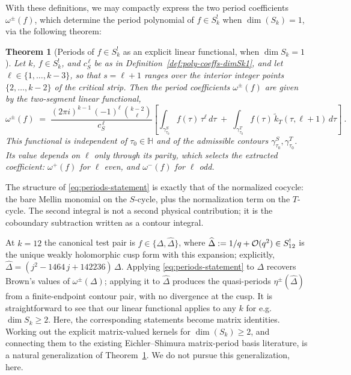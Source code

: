 \documentclass[11pt]{article}
\newtheorem{theorem}{Theorem}[section]
\numberwithin{equation}{section}  %
\newcommand{\HH}{\mathbb{H}}
\newcommand{\Dhat}{\widehat{\Delta}}
\begin{document}
\noindent With these definitions, we may compactly express the two
period coefficients $\omega^{\pm}(f)$, which determine the period
polynomial of $f \in S_k^!$ when $\dim(S_k) = 1$, via the following
theorem: 
\begin{theorem}[Periods of $f \in S_k^!$ as an explicit linear functional, when $\dim S_k = 1$]\label{thm:periods}
Let $k$, $f \in S_k^!$, and $c_S^{\,\ell}$ be as in
Definition~\ref{def:poly-coeffs-dimSk1}, and let
$\ell \in \{1, \ldots, k - 3\}$, so that $s = \ell + 1$ ranges over the
interior integer points $\{2, \ldots, k-2\}$ of the critical strip.
Then the period coefficients $\omega^\pm(f)$ are given by the
two-segment linear functional,
\begin{equation}\label{eq:periods-statement}
  \omega^\pm(f) \;=\; \frac{(2\pi i)^{k - 1}\,(-1)^{\ell}\,\binom{k - 2}{\ell}}{c_S^{\,\ell}}\!\left[
    \int_{\gamma^S_{\tau_0}}\!\! f(\tau)\,\tau^{\ell}\,d\tau
    \;+\;
    \int_{\gamma^T_{\tau_0}}\!\! f(\tau)\,\widetilde{k}_T(\tau, \ell + 1)\,d\tau
  \right]~.
\end{equation}
This functional is independent of $\tau_0 \in \HH$ and of the admissible
contours $\gamma^S_{\tau_0}, \gamma^T_{\tau_0}$.  Its value depends on
$\ell$ only through its parity, which selects the extracted coefficient:
$\omega^+(f)$ for $\ell$ even, and $\omega^-(f)$ for $\ell$
odd. %
\end{theorem}
 
The structure of \eqref{eq:periods-statement} is exactly that of the
normalized cocycle: the bare Mellin monomial on the $S$-cycle, plus the
normalization term on the $T$-cycle.  The second integral is not a second
physical contribution; it is the coboundary subtraction written as a
contour integral. 

At $k = 12$ the canonical test pair is $f \in \{\Delta, \Dhat\}$, where
$\Dhat := 1/q + {\cal O}(q^2) \in S^!_{12}$ is the unique weakly
holomorphic cusp form with this expansion; explicitly,
$\Dhat = (j^2 - 1464\,j + 142236)\,\Delta$. %
Applying \eqref{eq:periods-statement} to $\Delta$ recovers Brown's values
of $\omega^\pm(\Delta)$; applying it to $\Dhat$ produces the quasi-periods
$\eta^\pm(\Dhat)$ from a finite-endpoint contour pair, with no divergence
at the cusp.  It is straightforward to see that our linear functional
applies to any $k$ for e.g. $\dim S_k \ge 2$.  Here, the corresponding
statements become matrix identities.  Working out the explicit
matrix-valued kernels for $\dim(S_k) \ge 2$, and connecting them to the
existing Eichler--Shimura matrix-period basis literature, is a natural
generalization of Theorem~\ref{thm:periods}. We do not pursue this
generalization, here.
\end{document}
